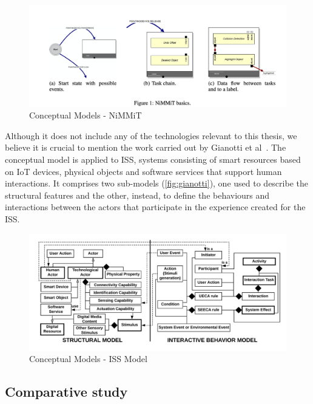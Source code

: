 \begin{figure}[h]
    \centering
    \includegraphics[width=\linewidth]{Figures/Background/models/vanacken1.png}
    \caption{Conceptual Models - NiMMiT}
    \label{fig:vanacken}
\end{figure}

Although it does not include any of the technologies relevant to this thesis, we believe it is crucial to mention the work carried out by Gianotti et al~\cite{dobbie_modeling_2020}. The conceptual model is applied to ISS, systems consisting of smart resources based on IoT devices, physical objects and software services that support human interactions. It comprises two sub-models (\autoref{fig:gianotti}), one used to describe the structural features and the other, instead, to define the behaviours and interactions between the actors that participate in the experience created for the ISS. 

\begin{figure}[h]
    \centering
    \includegraphics[width=\textwidth]{Figures/Background/models/gianotti.png}
    \caption{Conceptual Models - ISS Model}
    \label{fig:gianotti}
\end{figure}

\subsection{Comparative study}

